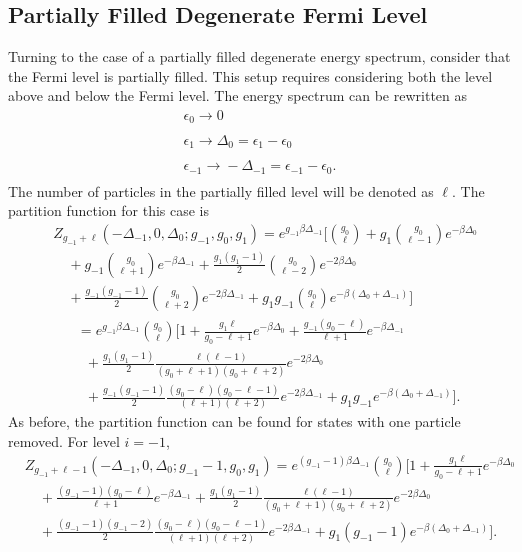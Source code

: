\subsection{Partially Filled Degenerate Fermi Level}\label{section:partdegen}
Turning to the case of a partially filled degenerate energy spectrum, consider that the Fermi level is partially filled. This setup requires considering both the level above and below the Fermi level. The energy spectrum can be rewritten as 
\begin{gather}
    \epsilon_0 \xrightarrow[]{} 0\nonumber\\
    \epsilon_1 \xrightarrow[]{} \Delta_0=\epsilon_1-\epsilon_0\nonumber\\
    \epsilon_{-1} \xrightarrow[]{} -\Delta_{-1}=\epsilon_{-1}-\epsilon_0.\nonumber
\end{gather}
The number of particles in the partially filled level will be denoted as $\ell$. The partition function for this case is
\begin{align}
    &Z_{g_{-1}+\ell}(-\Delta_{-1},0,\Delta_0;g_{-1},g_0,g_1) = e^{g_{-1}\beta\Delta_{-1}} \Biggr[{g_0\choose \ell}+g_1{g_0\choose \ell-1}e^{-\beta\Delta_0} \nonumber\\
    &\quad +g_{-1}{g_0\choose \ell+1}e^{-\beta\Delta_{-1}} +\frac{g_1(g_1-1)}{2} {g_0\choose \ell-2}e^{-2\beta\Delta_0}\nonumber\\ 
    &\quad +\frac{g_{-1}(g_{-1}-1)}{2} {g_0\choose \ell+2} e^{-2\beta\Delta_{-1}} +g_1g_{-1}{g_0\choose \ell} e^{-\beta(\Delta_0+\Delta_{-1})} \Biggr]\nonumber
\end{align}
\begin{align}
    &\ \ =e^{g_{-1}\beta\Delta_{-1}} {g_0\choose \ell} \Biggr[1+ \frac{g_1 \ell}{g_0-\ell+1} e^{-\beta\Delta_0} +\frac{g_{-1}(g_0-\ell)}{\ell+1} e^{-\beta\Delta_{-1}} \nonumber\\
    &\quad+\frac{g_1(g_1-1)}{2} \frac{\ell(\ell-1)}{(g_0+\ell+1)(g_0+\ell+2)}e^{-2\beta\Delta_0} \nonumber\\
    &\quad+\frac{g_{-1}(g_{-1}-1)}{2} \frac{(g_0-\ell)(g_0-\ell-1)}{(\ell+1)(\ell+2)} e^{-2\beta\Delta_{-1}}+g_1g_{-1}e^{-\beta(\Delta_0+\Delta_{-1})}\Biggr]. \label{2.34}
\end{align}
As before, the partition function can be found for states with one particle removed. For level $i=-1$,
\begin{align}
    &Z_{g_{-1}+\ell-1}(-\Delta_{-1},0,\Delta_0;g_{-1}-1,g_0,g_1)=e^{(g_{-1}-1)\beta\Delta_{-1}} {g_0\choose \ell} \Biggr[1+\frac{g_1 \ell}{g_0-\ell+1} e^{-\beta\Delta_0} \nonumber\\
    &\quad +\frac{(g_{-1}-1)(g_0-\ell)}{\ell+1} e^{-\beta\Delta_{-1}}+\frac{g_1(g_1-1)}{2} \frac{\ell(\ell-1)}{(g_0+\ell+1)(g_0+\ell+2)}e^{-2\beta\Delta_0} \nonumber\\
    &\quad+\frac{(g_{-1}-1)(g_{-1}-2)}{2} \frac{(g_0-\ell)(g_0-\ell-1)}{(\ell+1)(\ell+2)} e^{-2\beta\Delta_{-1}}+g_1(g_{-1}-1)e^{-\beta(\Delta_0+\Delta_{-1})}\Biggr]. 
\end{align}
